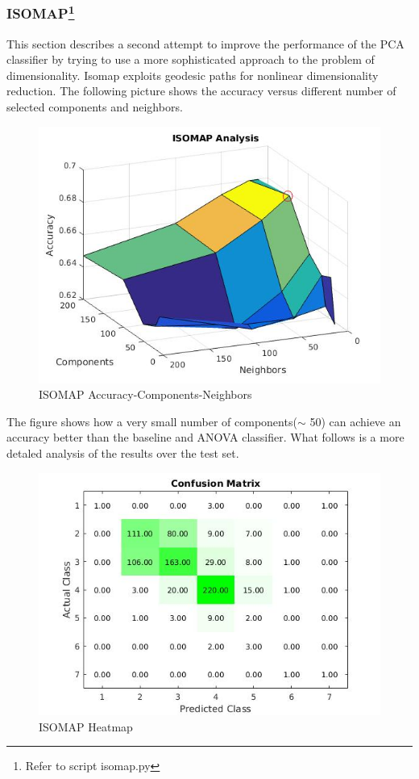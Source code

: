 \documentclass[a4paper,10pt]{article}
\begin{document}
     \subsubsection{ISOMAP\protect\footnote{Refer to script isomap.py}}
      This section describes a second attempt to improve the performance of the PCA classifier by trying to use a more 
      sophisticated approach to the problem of dimensionality. 
      Isomap exploits geodesic paths for nonlinear dimensionality reduction.\newline
      The following picture shows the accuracy versus different number of selected components and neighbors.
      \begin{figure}[H]
	\centering
	\includegraphics[scale=0.5]{iso-acc.jpg}
	\caption{ISOMAP Accuracy-Components-Neighbors}
      \end{figure}
      \noindent The figure shows how a very small number of components($\sim$ 50) 
      can achieve an accuracy better than the baseline and ANOVA classifier.\newline
      What follows is a more detaled analysis of the results over the test set.
      \begin{figure}[H]
	\centering
	\includegraphics[scale=0.5]{iso-heat.jpg}
	\caption{ISOMAP Heatmap}
      \end{figure}
\end{document}
